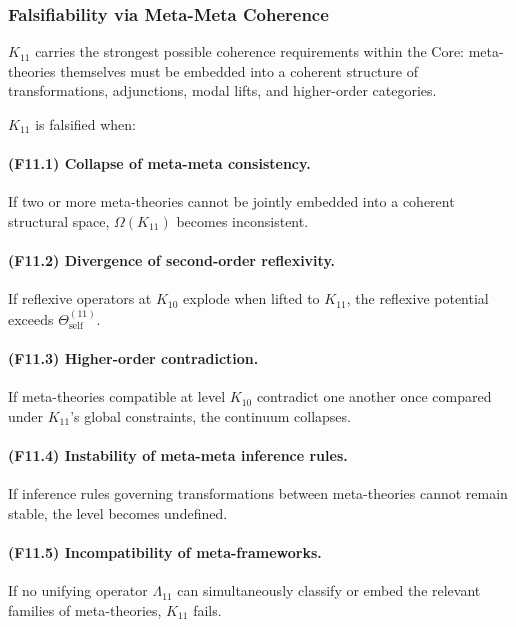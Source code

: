 \subsubsection{Falsifiability via Meta-Meta Coherence}

$K_{11}$ carries the strongest possible coherence requirements within the Core:
meta-theories themselves must be embedded into a coherent structure of
transformations, adjunctions, modal lifts, and higher-order categories.

$K_{11}$ is falsified when:

\paragraph{(F11.1) Collapse of meta-meta consistency.}
If two or more meta-theories cannot be jointly embedded
into a coherent structural space, $\Omega(K_{11})$ becomes inconsistent.

\paragraph{(F11.2) Divergence of second-order reflexivity.}
If reflexive operators at $K_{10}$ explode when lifted to $K_{11}$,
the reflexive potential exceeds $\Theta_{\mathrm{self}}^{(11)}$.

\paragraph{(F11.3) Higher-order contradiction.}
If meta-theories compatible at level $K_{10}$ contradict one another
once compared under $K_{11}$'s global constraints, the continuum collapses.

\paragraph{(F11.4) Instability of meta-meta inference rules.}
If inference rules governing transformations between
meta-theories cannot remain stable, the level becomes undefined.

\paragraph{(F11.5) Incompatibility of meta-frameworks.}
If no unifying operator $\Lambda_{11}$ can simultaneously classify or embed
the relevant families of meta-theories, $K_{11}$ fails.



